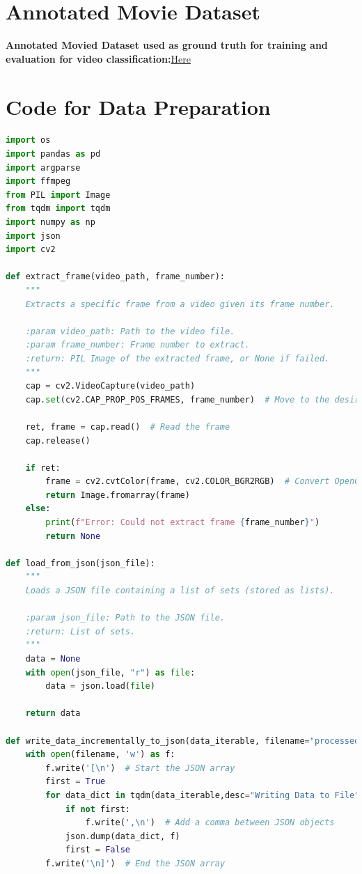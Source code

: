 \documentclass[12pt]{report}
\begin{document}
	\chapter{Annotated Movie Dataset} \label {app:movie_dataset}
	\textbf{Annotated Movied Dataset used as ground truth for training and evaluation for video classification:}\href{https://drive.google.com/file/d/1dvnYdUYhl6zQzJggLgC5r36W0nDtqqzX/view?usp=drive_link}{Here}
	\chapter{Code for Data Preparation} \label{app:data_prep}
	\begin{lstlisting}[language=Python, caption={Video DataSet Preparator Python Code}]
		import os
import pandas as pd
import argparse
import ffmpeg
from PIL import Image
from tqdm import tqdm
import numpy as np
import json
import cv2

def extract_frame(video_path, frame_number):
    """
    Extracts a specific frame from a video given its frame number.
    
    :param video_path: Path to the video file.
    :param frame_number: Frame number to extract.
    :return: PIL Image of the extracted frame, or None if failed.
    """
    cap = cv2.VideoCapture(video_path)
    cap.set(cv2.CAP_PROP_POS_FRAMES, frame_number)  # Move to the desired frame
    
    ret, frame = cap.read()  # Read the frame
    cap.release()
    
    if ret:
        frame = cv2.cvtColor(frame, cv2.COLOR_BGR2RGB)  # Convert OpenCV BGR to RGB
        return Image.fromarray(frame)
    else:
        print(f"Error: Could not extract frame {frame_number}")
        return None

def load_from_json(json_file):
    """
    Loads a JSON file containing a list of sets (stored as lists).
    
    :param json_file: Path to the JSON file.
    :return: List of sets.
    """
    data = None
    with open(json_file, "r") as file:
        data = json.load(file)
        
    return data

def write_data_incrementally_to_json(data_iterable, filename="processed_data_1.json"):
    with open(filename, 'w') as f:
        f.write('[\n')  # Start the JSON array
        first = True
        for data_dict in tqdm(data_iterable,desc="Writing Data to File"):
            if not first:
                f.write(',\n')  # Add a comma between JSON objects
            json.dump(data_dict, f)
            first = False
        f.write('\n]')  # End the JSON array
        

\end{lstlisting}
\end{document}
